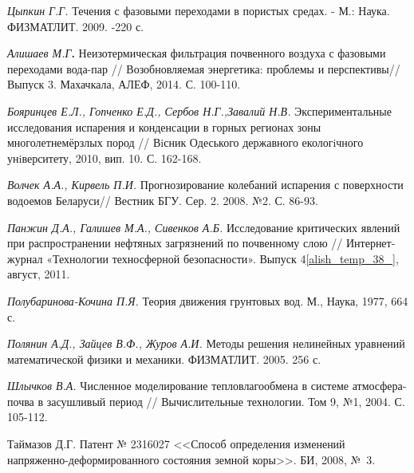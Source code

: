 \begin{thebibliography}{1}
  \textit{Цыпкин Г.Г.}\textbf{ }Течения с фазовыми переходами в пористых средах. - М.: Наука. ФИЗМАТЛИТ. 2009. -220 с.\textbf{~}

 \textbf{ }\textit{Алишаев М.Г}\textbf{.} Неизотермическая фильтрация почвенного воздуха с фазовыми переходами вода-пар //\textbf{ }Возобновляемая энергетика: проблемы и перспективы// Выпуск 3. Махачкала, АЛЕФ, 2014. С. 100-110.

  \textit{Бояринцев Е.Л., Гопченко Е.Д., Сербов Н.Г.,Завалий Н.В.} Экспериментальные исследования испарения и конденсации в горных регионах зоны многолетнемёрзлых пород // Вiсник Одеського державного екологiчного унiверситету, 2010, вип. 10. С. 162-168.

  \textit{Волчек А.А., Кирвель П.И.} Прогнозирование колебаний испарения с поверхности водоемов Беларуси// Вестник БГУ. Сер. 2. 2008. №2. С. 86-93.

  \textit{Панжин  Д.А., Галишев М.А., Сивенков А.Б.}\textbf{ }Исследование критических явлений при распространении нефтяных загрязнений по почвенному слою // Интернет-журнал «Технологии техносферной безопасности». Выпуск 4\eqref{alish_temp_38_}, август, 2011.

  \textit{Полубаринова-Кочина П.Я.} Теория движения грунтовых вод. М., Наука, 1977, 664 с.

  \textit{Полянин А.Д., Зайцев В.Ф., Журов А.И.} Методы решения нелинейных уравнений математической физики и механики. ФИЗМАТЛИТ. 2005. 256 с.

  \textit{Шлычков В.А.} Численное моделирование тепловлагообмена в системе атмосфера-почва в засушливый период // Вычислительные технологии. Том 9, №1, 2004. С. 105-112.


{Таймазов Д.Г.} Патент № 2316027 <<Способ определения изменений напряженно-деформированного состояния земной коры>>. БИ, 2008, №~3.


\end{thebibliography}
